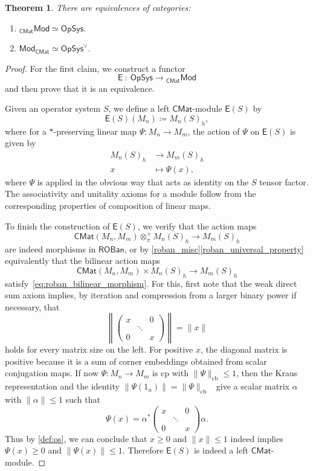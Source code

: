 \documentclass[11pt,onecolumn]{article}
\newcommand{\ROBan}{\mathsf{ROBan}}
\newcommand{\Mod}{\mathsf{Mod}}
\newcommand{\OpSys}{\mathsf{OpSys}}
\theoremstyle{plain}
\newtheorem{theorem}{Theorem}[subsection]
\theoremstyle{remark}
\theoremstyle{definition}
\begin{document}
\begin{theorem}
	\label{thm:op_sys_as_modules}
	There are equivalences of categories:
	\begin{enumerate}
		\item ${}_{\mathsf{CMat}} \Mod \simeq\mathsf{OpSys}$.
		\item $\Mod_\mathsf{CMat} \simeq \OpSys^\vee$.
	\end{enumerate}
\end{theorem}
\begin{proof}
	For the first claim, we construct a functor
	\[
		\mathsf{E} \: : \: \OpSys \longrightarrow {}_{\mathsf{CMat}} \Mod
	\]
	and then prove that it is an equivalence.

	Given an operator system $S$, we define a left $\mathsf{CMat}$-module $\mathsf{E}(S)$ by
	\[
		\mathsf{E}(S)(M_n) \coloneqq M_n(S)_h,
	\]
	where for a $*$-preserving linear map $\Psi \colon M_n \to M_m$, the action of $\Psi$ on $\mathsf{E}(S)$ is given by
	\begin{align*}
		M_n(S)_h & \longrightarrow M_m(S)_h \\
		x & \longmapsto \Psi(x),
	\end{align*}
	where $\Psi$ is applied in the obvious way that acts as identity on the $S$ tensor factor.
	The associativity and unitality axioms for a module follow from the corresponding properties of composition of linear maps.

	To finish the construction of $\mathsf{E}(S)$, we verify that the action maps
	\[
		\mathsf{CMat}(M_n,M_m) \otimes_\pi^+ M_n(S)_h \longrightarrow M_m(S)_h
	\]
	are indeed morphisms in $\ROBan$, or by \cref{roban_misc}\ref{roban_universal_property} equivalently that the bilinear action maps
	\[
		\mathsf{CMat}(M_n,M_m) \times M_n(S)_h \longrightarrow M_m(S)_h
	\]
	satisfy~\eqref{eq:roban_bilinear_morphism}.
	For this, first note that the weak direct sum axiom implies, by iteration and compression from a larger binary power if necessary, that
	\[
		\left\|
		\begin{pmatrix}
			x & & 0 \\
			  & \ddots & \\
			0 & & x
		\end{pmatrix}
		\right\|
		= \|x\|
	\]
	holds for every matrix size on the left.
	For positive $x$, the diagonal matrix is positive because it is a sum of corner embeddings obtained from scalar conjugation maps.
	If now $\Psi \colon M_n \to M_m$ is cp with $\|\Psi\|_{\mathrm{cb}} \le 1$,
	then the Kraus representation and the identity $\|\Psi(1_n)\| = \|\Psi\|_{\mathrm{cb}}$~\cite[Props.~3.6 and~4.7]{Paulsen} give a scalar matrix $\alpha$ with $\|\alpha\| \le 1$ such that
	\begin{equation}
		\label{eq:stinespring}
		\Psi(x)
		=
		\alpha^*
		\begin{pmatrix}
			x & & 0 \\
			  & \ddots & \\
			0 & & x
		\end{pmatrix}
		\alpha.
	\end{equation}
	Thus by \cref{def:os}, we can conclude that $x \ge 0$ and $\|x\| \le 1$ indeed implies $\Psi(x) \ge 0$ and $\|\Psi(x)\| \le 1$.
	Therefore $\mathsf{E}(S)$ is indeed a left $\mathsf{CMat}$-module.


\end{proof}
\end{document}
